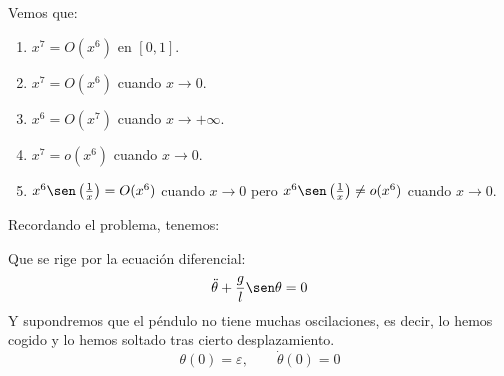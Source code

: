 \begin{ejemplo}
    Vemos que:
    \begin{enumerate}
        \item $x^7 = O(x^6)$ en $[0,1]$.
        \item $x^7 = O(x^6)$ cuando $x\to 0$.
        \item $x^6 = O(x^7)$ cuando $x\to +\infty$.
        \item $x^7 = o(x^6)$ cuando $x\to 0$.
        \item $x^6\sen\left(\frac{1}{x}\right) = O(x^6)$ cuando $x\to 0$ pero $x^6\sen\left(\frac{1}{x}\right) \neq o(x^6)$ cuando $x\to 0$.
    \end{enumerate}
\end{ejemplo}

\noindent
Recordando el problema, tenemos:
\begin{figure}[H]
    \centering
\end{figure}
Que se rige por la ecuación diferencial:
\noindent
\begin{equation*}
    \ddot{\theta} + \frac{g}{l}\sen \theta = 0
\end{equation*}
Y supondremos que el péndulo no tiene muchas oscilaciones, es decir, lo hemos cogido y lo hemos soltado tras cierto desplazamiento.
\begin{equation*}
    \theta(0) = \varepsilon, \qquad \dot{\theta}(0) = 0
\end{equation*}
